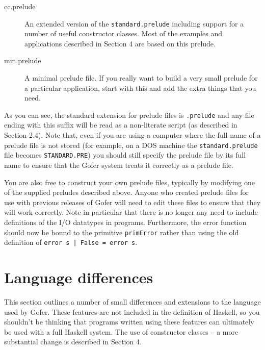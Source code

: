 \begin{description}
\item[cc.prelude]          An extended version of the \verb"standard.prelude"
                        including support for a number of useful
                        constructor classes.  Most of the examples
                        and applications described in Section 4 are
                        based on this prelude.

\item[min.prelude]         A minimal prelude file.  If you really want to
                        build a very small prelude for a particular
                        application, start with this and add the extra
                        things that you need.
\end{description}

As you can see, the standard extension for prelude files is \verb".prelude"
and any file ending with this suffix will be read as a non-literate
script (as described in Section 2.4).  Note that, even if you are using
a computer where the full name of a prelude file is not stored (for
example, on a DOS machine the \verb"standard.prelude" file becomes
\verb"STANDARD.PRE") you should still specify the prelude file by its full
name to ensure that the Gofer system treats it correctly as a prelude
file.

You are also free to construct your own prelude files, typically by
modifying one of the supplied preludes described above.  Anyone who
created prelude files for use with previous releases of Gofer will need
to edit these files to ensure that they will work correctly.  Note in
particular that there is no longer any need to include definitions of
the I/O datatypes in programs.  Furthermore, the error function should
now be bound to the primitive \verb"primError" rather than using the old
definition of \verb"error s | False = error s".


\section{Language differences}

This section outlines a number of small differences and extensions to
the language used by Gofer.  These features are not included in the
definition of Haskell, so you shouldn't be thinking that programs
written using these features can ultimately be used with a full Haskell
system.  The use of constructor classes -- a more substantial change is
described in Section 4.

